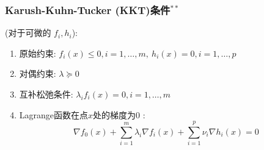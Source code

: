 \documentclass[handout,10pt]{beamer}
\begin{document}
\begin{frame}
	\frametitle{Karush-Kuhn-Tucker (KKT)条件$^{**}$}

	 (对于可微的 $f_i, h_i$):
	\begin{enumerate}[<+->]
		\item 原始约束: $f_{i}(x) \leq 0, i=1, \ldots, m,\  h_{i}(x)=0, i=1, \ldots, p$\\
		\item 对偶约束: $\lambda \succeq 0$\\
		\item 互补松弛条件: $\lambda_{i} f_{i}(x)=0, i=1, \ldots, m$\\
		\item Lagrange函数在点$x$处的梯度为0 :
	\begin{equation}
		\nabla f_{0}(x)+\sum_{i=1}^{m} \lambda_{i} \nabla f_{i}(x)+\sum_{i=1}^{p} \nu_{i} \nabla h_{i}(x)=0
	\end{equation}
	\end{enumerate}
\end{frame}
\end{document}
